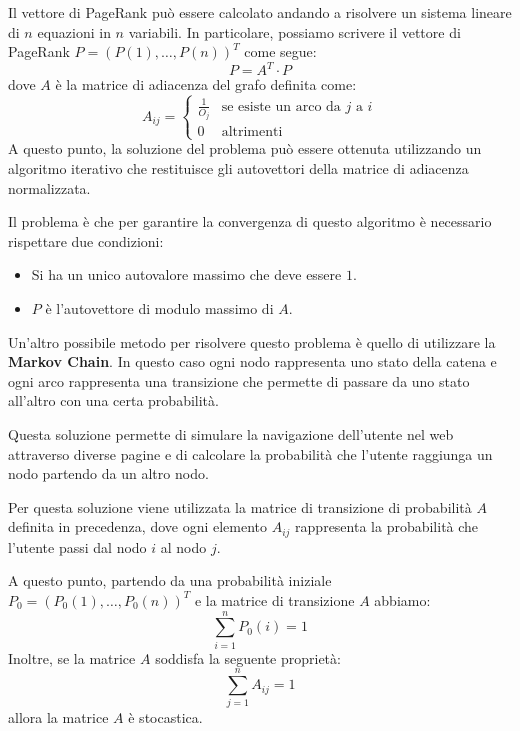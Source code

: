 Il vettore di PageRank può essere calcolato andando a risolvere un sistema
lineare di $n$ equazioni in $n$ variabili. In particolare, possiamo scrivere il
vettore di PageRank $P = (P(1), \dots, P(n))^T$ come segue:
\begin{equation}
    P = A^T \cdot P
\end{equation}
dove $A$ è la matrice di adiacenza del grafo definita come:
\begin{equation*}
    A_{ij} = \begin{cases}
        \frac{1}{O_j} & \text{se esiste un arco da $j$ a $i$} \\
        0             & \text{altrimenti}
    \end{cases}
\end{equation*}
A questo punto, la soluzione del problema può essere ottenuta utilizzando un
algoritmo iterativo che restituisce gli autovettori della matrice di adiacenza
normalizzata.

Il problema è che per garantire la convergenza di questo algoritmo è necessario
rispettare due condizioni:
\begin{itemize}
    \item Si ha un unico autovalore massimo che deve essere $1$.
    \item $P$ è l'autovettore di modulo massimo di $A$.
\end{itemize}

Un'altro possibile metodo per risolvere questo problema è quello di utilizzare
la \textbf{Markov Chain}. In questo caso ogni nodo rappresenta uno stato della
catena e ogni arco rappresenta una transizione che permette di passare da uno
stato all'altro con una certa probabilità.

Questa soluzione permette di simulare la navigazione dell'utente nel web
attraverso diverse pagine e di calcolare la probabilità che l'utente raggiunga
un nodo partendo da un altro nodo.

Per questa soluzione viene utilizzata la matrice di transizione di probabilità
$A$ definita in precedenza, dove ogni elemento $A_{ij}$ rappresenta la probabilità
che l'utente passi dal nodo $i$ al nodo $j$.

A questo punto, partendo da una probabilità iniziale $P_0 = (P_0(1), \dots, P_0(n))^T$
e la matrice di transizione $A$ abbiamo:
\begin{equation*}
    \sum_{i = 1}^n P_0(i) = 1
\end{equation*}
Inoltre, se la matrice $A$ soddisfa la seguente proprietà:
\begin{equation*}
    \sum_{j = 1}^n A_{ij} = 1
\end{equation*}
allora la matrice $A$ è stocastica.

